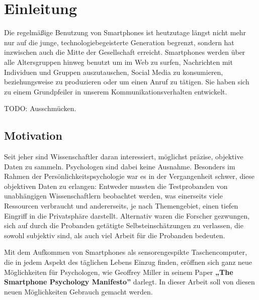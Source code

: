 
\chapter{Einleitung}
\label{ch:Einleitung}

Die regelmäßige Benutzung von Smartphones ist heutzutage längst nicht mehr nur auf die junge, technologiebegeisterte Generation begrenzt,
sondern hat inzwischen auch die Mitte der Gesellschaft erreicht\cite{smartphonealter}.
Smartphones werden über alle Altersgruppen hinweg benutzt um im Web zu surfen, Nachrichten mit Individuen und Gruppen auszutauschen, Social Media zu konsumieren, beziehungsweise zu produzieren oder um einen Anruf zu tätigen.
Sie haben sich zu einem Grundpfeiler in unserem Kommunikationsverhalten entwickelt.

\par

TODO: Ausschmücken.


\section{Motivation}

Seit jeher sind Wissenschaftler daran interessiert, möglichst präzise, objektive Daten zu sammeln.
Psychologen sind dabei keine Ausnahme.
Besonders im Rahmen der Persönlichkeitspsychologie war es in der Vergangenheit schwer, diese objektiven Daten zu erlangen:
Entweder mussten die Testprobanden von unabhängigen Wissenschaftlern beobachtet werden,
was einerseits viele Ressourcen verbraucht und andererseits, je nach Themengebiet,
einen tiefen Eingriff in die Privatsphäre darstellt. Alternativ waren die Forscher gezwungen,
sich auf durch die Probanden getätigte Selbsteinschätzungen zu verlassen,
die sowohl subjektiv sind, als auch viel Arbeit für die Probanden bedeuten. %
\par
Mit dem Aufkommen von Smartphones als sensorengespikte Taschencomputer, die in jedem Aspekt des täglichen Lebens Einzug finden,
eröffnen sich ganz neue Möglichkeiten für Psychologen, wie Geoffrey Miller in seinem Paper \textbf{„The Smartphone Psychology Manifesto”} \cite{miller2012smartphone}
darlegt. In dieser Arbeit soll von diesen neuen Möglichkeiten Gebrauch gemacht werden.\par




